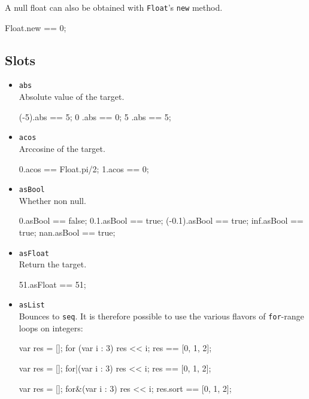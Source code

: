 A null float can also be obtained with \lstinline|Float|'s
\lstinline|new| method.

\begin{urbiassert}
Float.new == 0;
\end{urbiassert}

\subsection{Slots}

\begin{itemize}
\item \lstinline|abs|\\
  Absolute value of the target.
\begin{urbiassert}
(-5).abs == 5;
  0 .abs == 0;
  5 .abs == 5;
\end{urbiassert}

\item \lstinline|acos|\\
  Arccosine of the target.
\begin{urbiassert}
0.acos == Float.pi/2;
1.acos == 0;
\end{urbiassert}

\item \lstinline|asBool|\\
  Whether non null.
\begin{urbiassert}
0.asBool == false;
0.1.asBool == true;
(-0.1).asBool == true;
inf.asBool == true;
nan.asBool == true;
\end{urbiassert}

\item \lstinline|asFloat|\\
  Return the target.
\begin{urbiassert}
51.asFloat == 51;
\end{urbiassert}

\item \lstinline|asList|\\
  Bounces to \lstinline|seq|.  It is therefore possible to use the
  various flavors of \lstinline|for|-range loops on integers:
\begin{urbiassert}
{
  var res = [];
  for (var i : 3)
    res << i;
  res
}
== [0, 1, 2];

{
  var res = [];
  for|(var i : 3)
    res << i;
  res
}
== [0, 1, 2];

{
  var res = [];
  for&(var i : 3)
    res << i;
  res.sort
}
== [0, 1, 2];
\end{urbiassert}%


\end{itemize}
